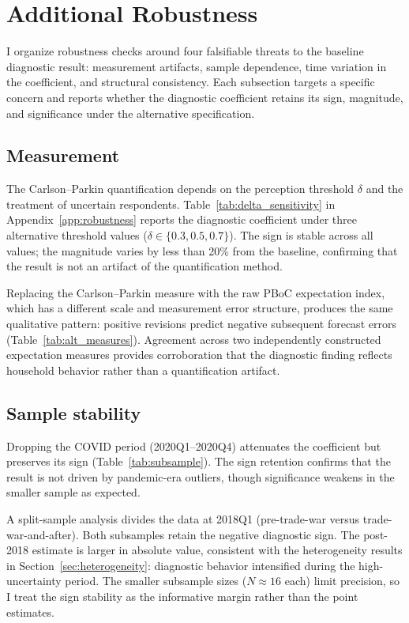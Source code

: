 \section{Additional Robustness}\label{app:robustness_main}

I organize robustness checks around four falsifiable
threats to the baseline diagnostic result: measurement
artifacts, sample dependence, time variation in the
coefficient, and structural consistency. Each subsection
targets a specific concern and reports whether the
diagnostic coefficient retains its sign, magnitude, and
significance under the alternative specification.

\subsection{Measurement}

The Carlson--Parkin quantification depends on the
perception threshold $\delta$ and the treatment of
uncertain respondents. Table~\ref{tab:delta_sensitivity}
in Appendix~\ref{app:robustness} reports the diagnostic
coefficient under three alternative threshold values
($\delta \in \{0.3, 0.5, 0.7\}$). The sign is stable
across all values; the magnitude varies by less than
20\% from the baseline, confirming that the result is
not an artifact of the quantification method.

Replacing the Carlson--Parkin measure with the raw PBoC
expectation index, which has a different scale and
measurement error structure, produces the same qualitative
pattern: positive revisions predict negative subsequent
forecast errors (Table~\ref{tab:alt_measures}). Agreement
across two independently constructed expectation measures
provides corroboration that the diagnostic finding reflects
household behavior rather than a quantification artifact.

\subsection{Sample stability}

Dropping the COVID period (2020Q1--2020Q4) attenuates
the coefficient but preserves its sign
(Table~\ref{tab:subsample}). The sign retention confirms
that the result is not driven by pandemic-era outliers,
though significance weakens in the smaller sample as
expected.

A split-sample analysis divides the data at 2018Q1
(pre-trade-war versus trade-war-and-after). Both
subsamples retain the negative diagnostic sign. The
post-2018 estimate is larger in absolute value, consistent
with the heterogeneity results in
Section~\ref{sec:heterogeneity}: diagnostic behavior
intensified during the high-uncertainty period. The
smaller subsample sizes ($N \approx 16$ each) limit
precision, so I treat the sign stability as the
informative margin rather than the point estimates.

